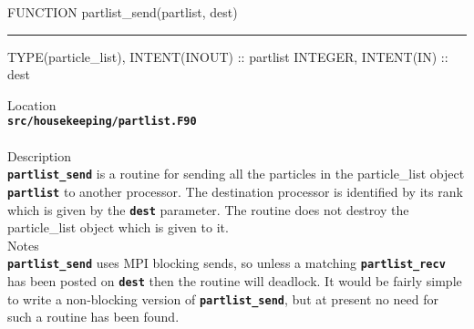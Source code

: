 \documentclass[12pt,a4paper]{article}
\newcommand{\HRule}{\rule[0.3cm]{\linewidth}{0.5mm}}
\newcommand{\inlinecode}[1]{{\color{warwickred} \bf\texttt{#1}}}
\begin{document}
\pagebreak
\begin{codedef}
FUNCTION partlist_send(partlist, dest)
\HRule
TYPE(particle_list), INTENT(INOUT) :: partlist
INTEGER, INTENT(IN) :: dest
\end{codedef}
\vspace{1cm}
{\Large Location\\}
\inlinecode{src/housekeeping/partlist.F90}\\
\\[0.5cm]
{\Large Description\\}
\inlinecode{partlist\_send} is a routine for sending all the particles in the
particle\_list object \inlinecode{partlist} to another processor. The
destination processor is identified by its rank which is given by the
\inlinecode{dest} parameter. The routine does not destroy the particle\_list
object which is given to it.
\\[0.5cm]
{\Large Notes\\}
\inlinecode{partlist\_send} uses MPI blocking sends, so unless a matching
\inlinecode{partlist\_recv} has been posted on \inlinecode{dest} then the
routine will deadlock. It would be fairly simple to write a non-blocking
version of \inlinecode{partlist\_send}, but at present no need for such a
routine has been found.
\end{document}
